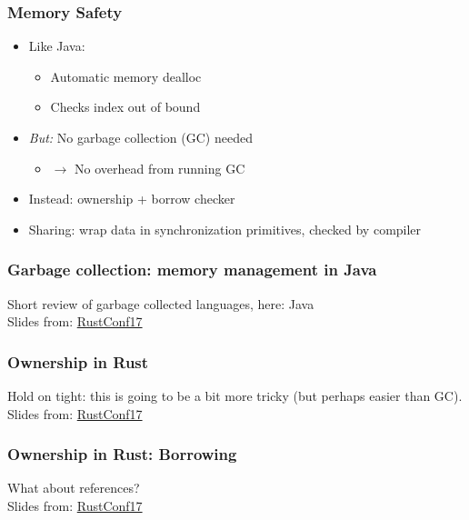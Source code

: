 \documentclass[aspectratio=169]{beamer}
\begin{document}
\begin{frame}
  \frametitle{Memory Safety}

  \begin{itemize}
  \item Like Java:
    \begin{itemize}
    \item Automatic memory dealloc
    \item Checks index out of bound
    \end{itemize}
  \pause
  \item \emph{But:} No garbage collection (GC) needed
    \begin{itemize}
    \item $\rightarrow$ No overhead from running GC
    \end{itemize}

  \pause
  \item Instead: ownership + borrow checker
  \item Sharing: wrap data in synchronization primitives, checked by compiler

  \end{itemize}
\end{frame}

\begin{frame}
  \frametitle{Garbage collection: memory management in Java}

  Short review of garbage collected languages, here: Java\\
  Slides from: \href{http://www.rust-tutorials.com/RustConf17/}{RustConf17}

\end{frame}

{
  
}

\begin{frame}
  \frametitle{Ownership in Rust}

  Hold on tight: this is going to be a bit more tricky (but perhaps easier than GC).\\
  Slides from: \href{http://www.rust-tutorials.com/RustConf17/}{RustConf17}

\end{frame}

{
  
}


\begin{frame}
  \frametitle{Ownership in Rust: Borrowing}

  What about references?\\
  Slides from: \href{http://www.rust-tutorials.com/RustConf17/}{RustConf17}

\end{frame}
\end{document}
